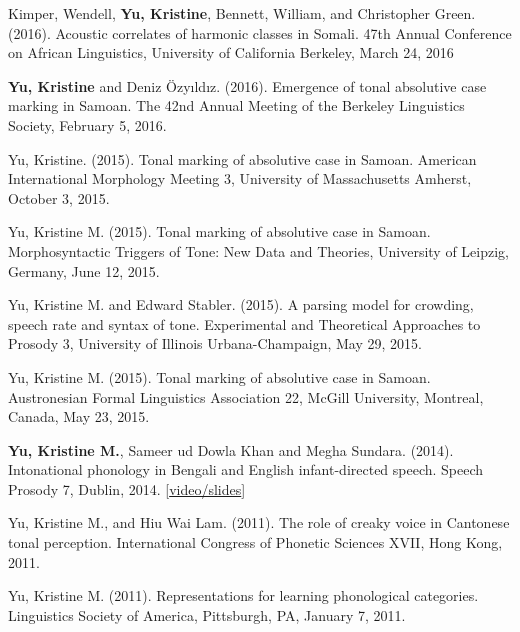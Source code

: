 \documentclass[10pt]{article}
\begin{document}
\begin{bibenum}


  \item Kimper, Wendell, \textbf{Yu, Kristine}, Bennett, William, and Christopher Green. (2016). Acoustic correlates of harmonic classes in
    Somali. 47th Annual Conference on African Linguistics, University
    of California Berkeley, March 24, 2016

  \item \textbf{Yu, Kristine} and Deniz \"{O}zy\i{}ld\i{}z. (2016). Emergence of tonal absolutive case
    marking in Samoan. The 42nd Annual Meeting of the Berkeley
    Linguistics Society, February 5, 2016.

  \item Yu, Kristine. (2015). Tonal marking of absolutive case in
    Samoan. American International Morphology Meeting 3, University of
    Massachusetts Amherst, October 3, 2015.

  \item Yu, Kristine M. (2015). Tonal marking of absolutive case in
    Samoan. Morphosyntactic Triggers of Tone:
New Data and Theories, University of Leipzig, Germany, June 12, 2015.  

  \item Yu, Kristine M. and Edward Stabler. (2015). A parsing model for crowding, speech rate and syntax of tone. Experimental and Theoretical Approaches to Prosody 3,
    University of Illinois Urbana-Champaign, May 29, 2015.

  \item Yu, Kristine M. (2015). Tonal marking of absolutive case in
    Samoan. Austronesian Formal Linguistics Association 22, McGill
    University, Montreal, Canada, May 23, 2015.  

\item \textbf{Yu, Kristine M.}, Sameer ud Dowla Khan and Megha
  Sundara. (2014). Intonational phonology in Bengali and English
  infant-directed speech. Speech Prosody 7, Dublin, 2014. [\href{https://www.superlectures.com/speechprosody2014/intonational-phonology-in-bengali-and-english-infant-directed-speech}{video/slides}]
  \item Yu, Kristine M., and Hiu Wai Lam. (2011). The role of creaky voice in Cantonese
    tonal perception. International Congress of Phonetic Sciences XVII, Hong Kong, 2011.

  \item Yu, Kristine M. (2011). Representations for learning
    phonological categories. Linguistics Society of America,
    Pittsburgh, PA, January 7, 2011.  


\end{bibenum}
\end{document}

